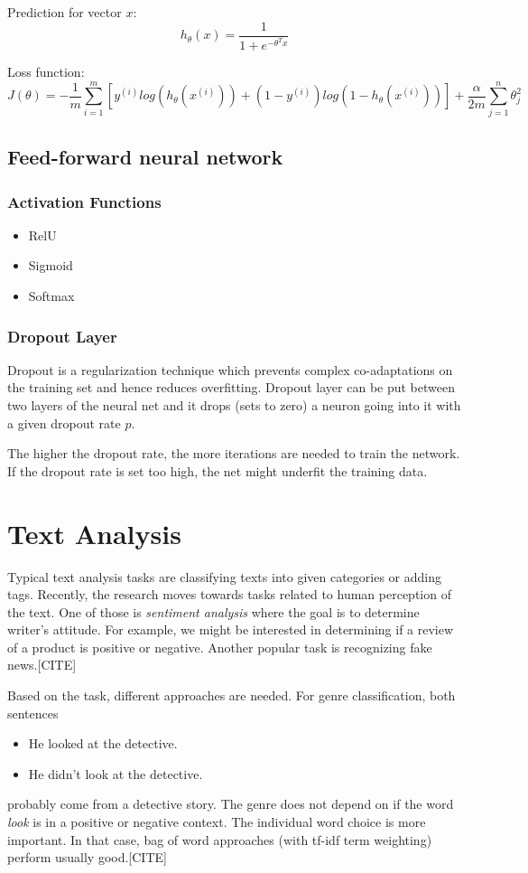 Prediction for vector $x$:
$$h_{\theta} (x) = \frac{1}{1 + e^{-\theta^T x}}$$

Loss function:
$$J(\theta) = -\frac{1}{m} \sum_{i = 1}^{m}[y^{(i)}log(h_\theta(x^{(i)})) + (1-y^{(i)})log(1-h_\theta(x^{(i)}))] + \frac{\alpha}{2m}\sum_{j=1}^n \theta_j^2$$

\subsection{Feed-forward neural network}
\smallskip
\subsubsection{Activation Functions}
\begin{itemize}
    \item RelU
    \item Sigmoid
    \item Softmax
\end{itemize}

\subsubsection{Dropout Layer}
Dropout\cite{dropout1}\cite{dropout2} is a regularization technique which prevents complex co-adaptations on the training set and hence reduces overfitting. Dropout layer can be put between two layers of the neural net and it drops (sets to zero) a neuron going into it with a given dropout rate $p$.

The higher the dropout rate, the more iterations are needed to train the network. If the dropout rate is set too high, the net might underfit the training data.

\section{Text Analysis}
\label{text_analysis}

Typical text analysis tasks are classifying texts into given categories or adding tags. Recently, the research moves towards tasks related to human perception of the text. One of those is \textit{sentiment analysis} where the goal is to determine writer's attitude. For example, we might be interested in determining if a review of a product is positive or negative. Another popular task is recognizing fake news.[CITE]

Based on the task, different approaches are needed. For genre classification, both sentences
\begin{itemize}
    \item He looked at the detective.
    \item He didn't look at the detective.
\end{itemize}
probably come from a detective story. The genre does not depend on if the word \textit{look} is in a positive or negative context. The individual word choice is more important. In that case, bag of word approaches (with tf-idf term weighting) perform usually good.[CITE]

